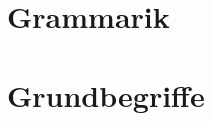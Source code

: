 \documentclass[handout,aspectratio=1610,dvipsnames]{beamer}
\begin{document}
  \section[Grammatik]{Grammarik}
  \let\woopsi\section\let\section\subsection\let\subsection\subsubsection
  
  \let\subsection\section\let\section\woopsi

  \section[Grundbegriffe]{Grundbegriffe}
  \let\woopsi\section\let\section\subsection\let\subsection\subsubsection
  
  \let\subsection\section\let\section\woopsi
\end{document}

